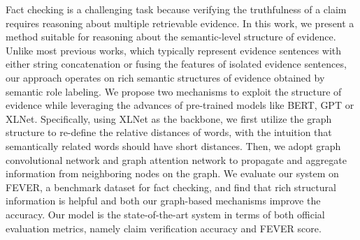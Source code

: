Fact checking is a challenging task because verifying the truthfulness of a claim requires reasoning about multiple retrievable evidence. In this work, we present a method suitable for reasoning about the semantic-level structure of evidence. Unlike most previous works, which typically represent evidence sentences with either string concatenation or fusing the features of isolated evidence sentences, our approach operates on rich semantic structures of evidence obtained by semantic role labeling. We propose two mechanisms to exploit the structure of evidence while leveraging the advances of pre-trained models like BERT, GPT or XLNet. Specifically, using XLNet as the backbone, we first utilize the graph structure to re-define the relative distances of words, with the intuition that semantically related words should have short distances. Then, we adopt graph convolutional network and graph attention network to propagate and aggregate information from neighboring nodes on the graph. We evaluate our system on FEVER, a benchmark dataset for fact checking, and find that rich structural information is helpful and both our graph-based mechanisms improve the accuracy. Our model is the state-of-the-art system in terms of both official evaluation metrics, namely claim verification accuracy and FEVER score.
